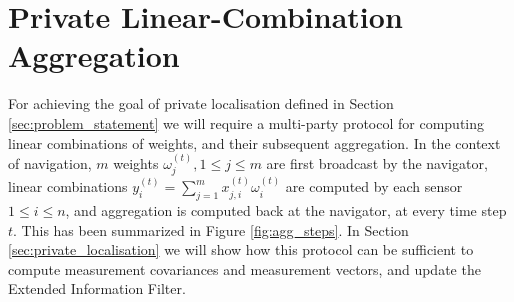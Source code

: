 \documentclass[twocolumn]{autart}
\theoremstyle{definition}
\theoremstyle{remark}
\begin{document}
% 
% 

\section{Private Linear-Combination Aggregation}
For achieving the goal of private localisation defined in Section \ref{sec:problem_statement} we will require a multi-party protocol for computing linear combinations of weights, and their subsequent aggregation. In the context of navigation, $m$ weights $\omega_j^{(t)}, 1 \leq j \leq m$ are first broadcast by the navigator, linear combinations $y^{(t)}_i=\sum^m_{j=1}x_{j,i}^{(t)}\omega_i^{(t)}$ are computed by each sensor $1\leq i\leq n$, and aggregation is computed back at the navigator, at every time step $t$. This has been summarized in Figure \ref{fig:agg_steps}. In Section \ref{sec:private_localisation} we will show how this protocol can be sufficient to compute measurement covariances and measurement vectors, and update the Extended Information Filter.
\end{document}

